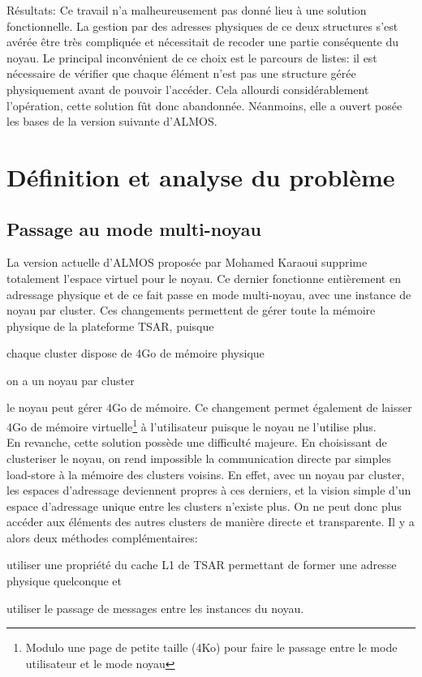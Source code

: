       \begin{paragraph}{Résultats:}
        Ce travail n'a malheureusement pas donné lieu à une solution
        fonctionnelle. La gestion par des adresses physiques de ce deux
        structures s'est avérée être très compliquée et nécessitait de recoder
        une partie conséquente du noyau. Le principal inconvénient de ce choix
        est le parcours de listes: il est nécessaire de vérifier que chaque
        élément n'est pas une structure gérée physiquement avant de pouvoir
        l'accéder. Cela allourdi considérablement l'opération, cette solution
        fût donc abandonnée. Néanmoins, elle a ouvert posée les bases de la
        version suivante d'ALMOS.
      \end{paragraph}


  \section{Définition et analyse du problème}      

    \subsection{Passage au mode multi-noyau}
    \label{sec:multi-noyau}

      La version actuelle d'ALMOS proposée par Mohamed Karaoui supprime
      totalement l'espace virtuel pour le noyau. Ce dernier fonctionne
      entièrement en adressage physique et de ce fait passe en mode multi-noyau,
      avec une instance de noyau par cluster. Ces changements permettent de
      gérer toute la mémoire physique de la plateforme TSAR, puisque
      \benumline \item chaque cluster dispose de 4Go de mémoire physique \item
      on a un noyau par cluster \item le noyau peut gérer 4Go de
      mémoire\eenumline. Ce changement permet également de laisser 4Go de
      mémoire virtuelle\footnote{Modulo une page de petite taille (4Ko) pour
        faire le passage entre le mode utilisateur et le mode noyau} à
      l'utilisateur puisque le noyau ne l'utilise plus.\\

    En revanche, cette solution possède une difficulté majeure. En choisissant
    de clusteriser le noyau, on rend impossible la communication directe par
    simples load-store à la mémoire des clusters voisins. En effet, avec un
    noyau par cluster, les espaces d'adressage deviennent propres à ces
    derniers, et la vision simple d'un espace d'adressage unique entre les
    clusters n'existe plus. On ne peut donc plus accéder aux éléments des autres
    clusters de manière directe et transparente. Il y a alors deux méthodes
    complémentaires:\benumline \item utiliser une propriété du cache L1 de TSAR
    permettant de former une adresse physique quelconque et \item utiliser le
    passage de messages entre les instances du noyau\eenumline.\\

